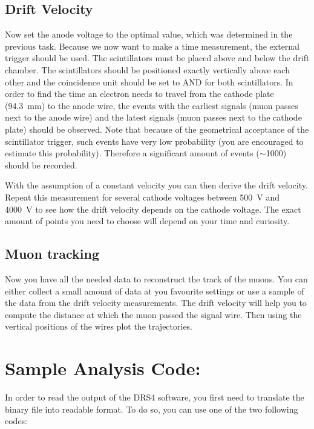 \documentclass[12pt]{article}
\begin{document}
\subsection{Drift Velocity}
Now set the anode voltage to the optimal value, which was determined in the previous task. Because we now want to make a time measurement, the external trigger should be used. The scintillators must be placed above and below the drift chamber. The scintillators should be positioned exactly vertically above each other and the coincidence unit should be set to AND for both scintillators. In order to find the time an electron needs to travel from the cathode plate (\SI{94.3}{\milli\meter}) to the anode wire, the events with the earliest signals (muon passes next to the anode wire) and the latest signals (muon passes next to the cathode plate) should be observed. Note that because of the geometrical acceptance of the scintillator trigger, such events have very low probability (you are encouraged to estimate this probability). Therefore a significant amount of events ($\sim$1000) should be recorded.

 With the assumption of a constant velocity you can then derive the drift velocity. Repeat this measurement for several cathode voltages between \SI{500}{\volt} and \SI{4000}{\volt} to see how the drift velocity depends on the cathode voltage. The exact amount of points you need to choose will depend on your time and curiosity.

\subsection{Muon tracking}

Now you have all the needed data to reconstruct the track of the muons. You can either collect a small amount of data at you favourite settings or use a sample of the data from the drift velocity measurements. The drift velocity will help you to compute the distance at which the muon passed the signal wire. Then using the vertical positions of the wires plot the trajectories.




\pagebreak

\appendix
\section{Sample Analysis Code:}\label{sec:decode}
In order to read the output of the DRS4 software, you first need to translate the binary file into readable format. To do so, you can use one of the two following codes:
\end{document}
